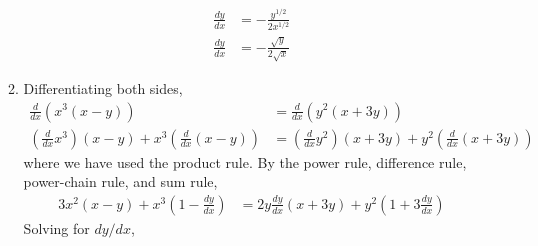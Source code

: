 \documentclass{article}
\begin{document}
\begin{enumerate}
\begin{enumerate}
    \begin{align*}
      \frac{dy}{dx} &= -\frac{y^{1/2}}{2x^{1/2}} \\
      \frac{dy}{dx} &= -\frac{\sqrt{y}}{2\sqrt{x}}
    \end{align*}
  \item Differentiating both sides,
    \begin{align*}
      \frac{d}{dx} \left(x^3(x-y)\right) &= \frac{d}{dx}
      \left(y^2(x+3y)\right) \\
      \left(\frac{d}{dx} x^3\right) (x-y) + x^3
      \left(\frac{d}{dx}(x-y)\right) &= \left(\frac{d}{dx} y^2 \right)
      (x+3y) + y^2 \left( \frac{d}{dx} (x+3y) \right) 
    \end{align*}
    where we have used the product rule.  By the power rule,
    difference rule, power-chain rule, and sum rule,
    \begin{align*}
      3x^2 (x-y) + x^3 \left(1-\frac{dy}{dx}\right) &= 2y
      \frac{dy}{dx} (x+3y) + y^2 \left( 1+3\frac{dy}{dx} \right)
    \end{align*}
    Solving for $dy/dx$,
    \begin{align*}

\end{align*}
\end{enumerate}
\end{enumerate}
\end{document}
